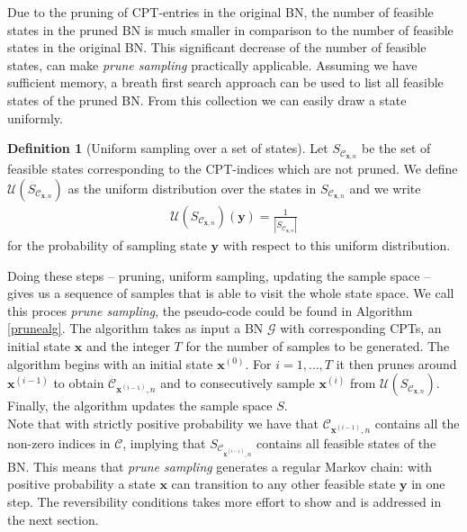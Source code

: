 \documentclass[a4paper, twoside, 11pt]{report}
\theoremstyle{plain}
\theoremstyle{definition}
\newtheorem{definition}[thm]{Definition}
\theoremstyle{remark}
\newcommand{\C}{{\mathcal C}}
\newcommand{\G}{{\mathcal G}}
\newcommand{\U}{{\mathcal{U}}}
\newcommand{\bfx}{{\mathbf{x}}}
\newcommand{\bfy}{{\mathbf{y}}}
\begin{document}
Due to the pruning of CPT-entries in the original BN, the number of feasible states in the pruned BN is much smaller in comparison to the number of feasible states in the original BN. This significant decrease of the number of feasible states, can make \textit{prune sampling} practically applicable. Assuming we have sufficient memory, a breath first search approach can be used to list all feasible states of the pruned BN. From this collection we can easily draw a state uniformly.

\begin{definition}[Uniform sampling over a set of states]
Let $S_{\C_{\bfx,n}}$ be the set of feasible states corresponding to the CPT-indices which are not pruned. We define $\U(S_{\C_{\bfx,n}})$
as the uniform distribution over the states in $S_{\C_{\bfx,n}}$ and we write
\begin{align*}
\U(S_{\C_{\bfx,n}})(\bfy) = \frac{1}{|S_{\C_{\bfx,n}}|}
\end{align*}
for the probability of sampling state $\bfy$ with respect to this uniform distribution.
\end{definition}
Doing these steps -- pruning, uniform sampling, updating the sample space --  gives us a sequence of samples that is able to visit the whole state space. We call this proces \textit{prune sampling}, the pseudo-code could be found in Algorithm \ref{prunealg}. The algorithm takes as input a BN $\G$ with corresponding CPTs, an initial state $\bfx$ and the integer $T$ for the number of samples to be generated. The algorithm begins with an initial state $\bfx^{(0)}$. For $i = 1, \ldots , T$ it then prunes around $\bfx^{(i-1)}$ to obtain $\C_{\bfx^{(i-1)}, n}$ and to consecutively sample $\bfx^{(i)}$ from $\U(S_{\C_{\bfx,n}})$. Finally, the algorithm updates the sample space $S$. \\ 
\indent Note that with strictly positive probability we have that $\C_{\bfx^{(i-1)}, n}$ contains all the non-zero indices in $\C$, implying that $S_{\C_{\bfx^{(i-1)}, n}}$ contains all feasible states of the BN. This means that \textit{prune sampling} generates a regular Markov chain: with positive probability a state $\bfx$ can transition to any other feasible state $\bfy$ in one step. The reversibility conditions takes more effort to show and is addressed in the next section. 
\end{document}
